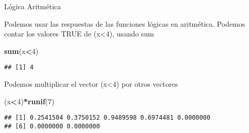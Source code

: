 \documentclass[ignorenonframetext,]{beamer}
\newenvironment{Shaded}{\begin{snugshade}}{\end{snugshade}}
\newcommand{\KeywordTok}[1]{\textcolor[rgb]{0.13,0.29,0.53}{\textbf{#1}}}
\newcommand{\DecValTok}[1]{\textcolor[rgb]{0.00,0.00,0.81}{#1}}
\newcommand{\OperatorTok}[1]{\textcolor[rgb]{0.81,0.36,0.00}{\textbf{#1}}}
\newcommand{\NormalTok}[1]{#1}
\begin{document}
\begin{frame}[fragile]{Lógica Aritmética}

Podemos usar las respuestas de las funciones lógicas en aritmética.
Podemos contar los valores TRUE de (x\textless{}4), usando sum

\begin{Shaded}
\begin{Highlighting}[]
\KeywordTok{sum}\NormalTok{(x}\OperatorTok{<}\DecValTok{4}\NormalTok{)}
\end{Highlighting}
\end{Shaded}

\begin{verbatim}
## [1] 4
\end{verbatim}

Podemos multiplicar el vector (x\textless{}4) por otros vectores

\begin{Shaded}
\begin{Highlighting}[]
\NormalTok{(x}\OperatorTok{<}\DecValTok{4}\NormalTok{)}\OperatorTok{*}\KeywordTok{runif}\NormalTok{(}\DecValTok{7}\NormalTok{)}
\end{Highlighting}
\end{Shaded}

\begin{verbatim}
## [1] 0.2541504 0.3750152 0.9489598 0.6974481 0.0000000
## [6] 0.0000000 0.0000000
\end{verbatim}

\end{frame}
\end{document}
